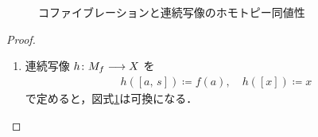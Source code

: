 \documentclass[algtopo_main]{subfiles}
\begin{document}
\begin{figure}[H]
    \centering
    \caption{コファイブレーションと連続写像のホモトピー同値性}
    \label{cmtd:continuous-cofibration}
\end{figure}%

\begin{proof}
    \begin{enumerate}
        \item 連続写像 $h \colon M_f \longrightarrow X$ を
        \begin{align}
            h([a,\, s]) \coloneqq f(a),\quad h([x])  \coloneqq x
        \end{align}
        で定めると，図式\ref{cmtd:continuous-cofibration}は可換になる．


\end{enumerate}
\end{proof}
\end{document}
